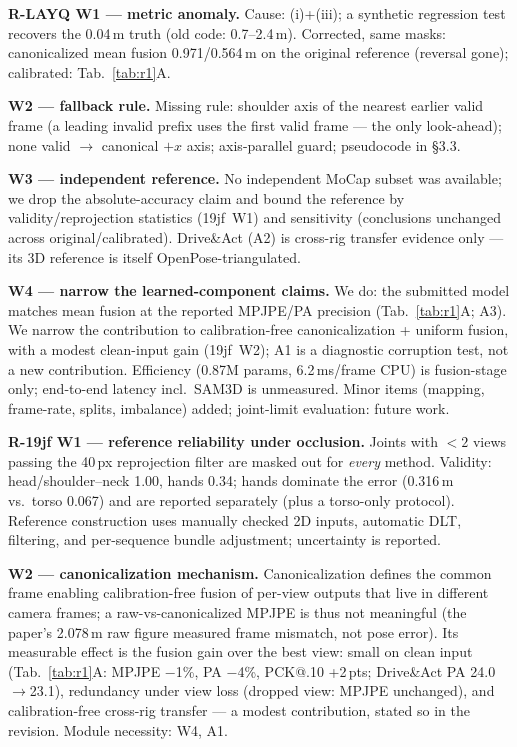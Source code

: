 \documentclass[10pt,twocolumn,letterpaper]{article}
\newcommand{\rpoint}[1]{\noindent\textbf{#1}\;}
\begin{document}
\rpoint{R-LAYQ W1 --- metric anomaly.}
Cause: (i)+(iii); a synthetic regression test recovers the 0.04\,m truth (old code: 0.7--2.4\,m). Corrected, same masks: canonicalized mean fusion 0.971/0.564\,m on the original reference (reversal gone); calibrated: Tab.~\ref{tab:r1}A.

\rpoint{W2 --- fallback rule.}
Missing rule: shoulder axis of the nearest earlier valid frame (a leading invalid prefix uses the first valid frame --- the only look-ahead); none valid $\to$ canonical $+x$ axis; axis-parallel guard; pseudocode in \S3.3.

\rpoint{W3 --- independent reference.}
No independent MoCap subset was available; we drop the absolute-accuracy claim and bound the reference by validity/reprojection statistics (19jf~W1) and sensitivity (conclusions unchanged across original/calibrated). Drive\&Act (A2) is cross-rig transfer evidence only --- its 3D reference is itself OpenPose-triangulated.

\rpoint{W4 --- narrow the learned-component claims.}
We do: the submitted model matches mean fusion at the reported MPJPE/PA precision (Tab.~\ref{tab:r1}A; A3). We narrow the contribution to calibration-free canonicalization + uniform fusion, with a modest clean-input gain (19jf~W2); A1 is a diagnostic corruption test, not a new contribution. Efficiency (0.87M params, 6.2\,ms/frame CPU) is fusion-stage only; end-to-end latency incl.\ SAM3D is unmeasured. Minor items (mapping, frame-rate, splits, imbalance) added; joint-limit evaluation: future work.

\rpoint{R-19jf W1 --- reference reliability under occlusion.}
Joints with $<2$ views passing the 40\,px reprojection filter are masked out for \emph{every} method. Validity: head/shoulder--neck 1.00, hands 0.34; hands dominate the error (0.316\,m vs.\ torso 0.067) and are reported separately (plus a torso-only protocol). Reference construction uses manually checked 2D inputs, automatic DLT, filtering, and per-sequence bundle adjustment; uncertainty is reported.

\rpoint{W2 --- canonicalization mechanism.}
Canonicalization defines the common frame enabling calibration-free fusion of per-view outputs that live in different camera frames; a raw-vs-canonicalized MPJPE is thus not meaningful (the paper's 2.078\,m raw figure measured frame mismatch, not pose error). Its measurable effect is the fusion gain over the best view: small on clean input (Tab.~\ref{tab:r1}A: MPJPE $-$1\%, PA $-$4\%, PCK@.10 +2\,pts; Drive\&Act PA 24.0$\to$23.1), redundancy under view loss (dropped view: MPJPE unchanged), and calibration-free cross-rig transfer --- a modest contribution, stated so in the revision. Module necessity: W4, A1.
\end{document}
